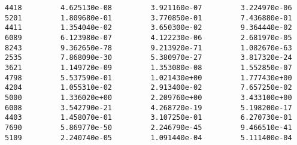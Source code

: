 \documentclass[11pt]{article}
\begin{document}
\begin{verbatim}
4418         4.625130e-08         3.921160e-07         3.224970e-06   
5201         1.809680e-01         3.770850e-01         7.436880e-01   
4411         1.354040e-02         3.650300e-02         9.364440e-02   
6089         6.123980e-07         4.122230e-06         2.681970e-05   
8243         9.362650e-78         9.213920e-71         1.082670e-63   
2535         7.868090e-30         5.380970e-27         3.817320e-24   
3621         1.149720e-09         1.353080e-08         1.552850e-07   
4798         5.537590e-01         1.021430e+00         1.777430e+00   
4204         1.055310e-02         2.913400e-02         7.657250e-02   
5000         1.336020e+00         2.209760e+00         3.433100e+00   
6008         3.542790e-21         4.268720e-19         5.198200e-17   
4403         1.458070e-01         3.107250e-01         6.270730e-01   
7690         5.869770e-50         2.246790e-45         9.466510e-41   
5109         2.240740e-05         1.091440e-04         5.111400e-04   


\end{verbatim}
\end{document}
